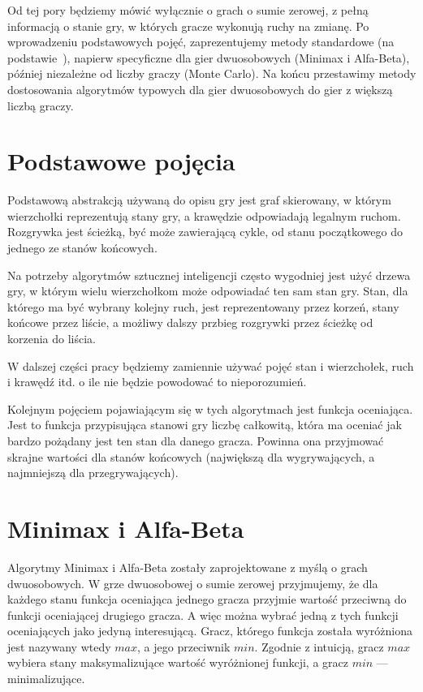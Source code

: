 \documentclass{pracamgr}
\begin{document}
Od tej pory będziemy mówić wyłącznie o grach o sumie zerowej, z pełną informacją o stanie gry, w których gracze wykonują ruchy na zmianę.
Po wprowadzeniu podstawowych pojęć, zaprezentujemy metody standardowe (na podstawie~\cite{pawlewicz}), napierw specyficzne dla gier dwuosobowych (Minimax i Alfa-Beta), później niezależne od liczby graczy (Monte Carlo).
Na końcu przestawimy metody dostosowania algorytmów typowych dla gier dwuosobowych do gier z większą liczbą graczy.

\section{Podstawowe pojęcia}

Podstawową abstrakcją używaną do opisu gry jest graf skierowany, w którym wierzchołki reprezentują stany gry, a krawędzie odpowiadają legalnym ruchom.
Rozgrywka jest ścieżką, być może zawierającą cykle, od stanu początkowego do jednego ze stanów końcowych.

Na potrzeby algorytmów sztucznej inteligencji często wygodniej jest użyć drzewa gry, w którym wielu wierzchołkom może odpowiadać ten sam stan gry.
Stan, dla którego ma być wybrany kolejny ruch, jest reprezentowany przez korzeń, stany końcowe przez liście, a możliwy dalszy przbieg rozgrywki przez ścieżkę od korzenia do liścia.

W dalszej części pracy będziemy zamiennie używać pojęć stan i wierzchołek, ruch i krawędź itd. o ile nie będzie powodować to nieporozumień.

Kolejnym pojęciem pojawiającym się w tych algorytmach jest funkcja oceniająca.
Jest to funkcja przypisująca stanowi gry liczbę całkowitą, która ma oceniać jak bardzo pożądany jest ten stan dla danego gracza.
Powinna ona przyjmować skrajne wartości dla stanów końcowych (największą dla wygrywających, a najmniejszą dla przegrywających).

\section{Minimax i Alfa-Beta}

Algorytmy Minimax i Alfa-Beta zostały zaprojektowane z myślą o grach dwuosobowych.
W grze dwuosobowej o sumie zerowej przyjmujemy, że dla każdego stanu funkcja oceniająca jednego gracza przyjmie wartość przeciwną do funkcji oceniającej drugiego gracza.
A więc można wybrać jedną z tych funkcji oceniających jako jedyną interesującą.
Gracz, którego funkcja została wyróżniona jest nazywany wtedy \(max\), a jego przeciwnik \(min\).
Zgodnie z intuicją, gracz \(max\) wybiera stany maksymalizujące wartość wyróżnionej funkcji, a gracz \(min\) --- minimalizujące.
\end{document}
